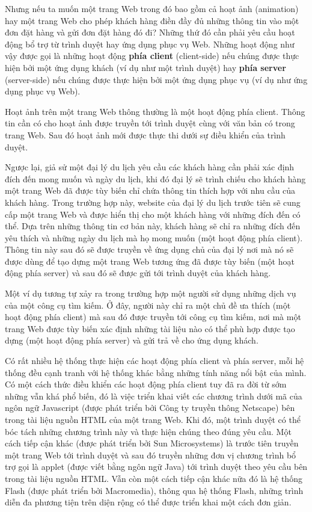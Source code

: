 Nhưng nếu ta muốn một trang Web trong đó bao gồm cả hoạt ảnh (animation) hay một
trang Web cho phép khách hàng điền đầy đủ những thông tin vào một đơn đặt hàng và gửi đơn
đặt hàng đó đi? Những thứ đó cần phải yêu cầu hoạt động bổ trợ từ trình duyệt hay ứng dụng
phục vụ Web. Những hoạt động như vậy được gọi là những hoạt động \textbf{phía client}
(client-side) nếu chúng được thực hiện bởi một ứng dụng khách (ví dụ như một trình duyệt)
hay \textbf{phía server} (server-side) nếu chúng được thực hiện bởi một ứng dụng phục vụ
(ví dụ như ứng dụng phục vụ Web).

Hoạt ảnh trên một trang Web thông thường là một hoạt động phía client. Thông tin cần có
cho hoạt ảnh được truyền tới trình duyệt cùng với văn bản có trong trang Web. Sau đó hoạt
ảnh mới được thực thi dưới sự điều khiển của trình duyệt.

Ngược lại, giả sử một đại lý du lịch yêu cầu các khách hàng cần phải xác định đích đến
mong muốn và ngày du lịch, khi đó đại lý sẽ trình chiếu cho khách hàng một trang Web đã
được tùy biến chỉ chứa thông tin thích hợp với nhu cầu của khách hàng. Trong trường hợp
này, website của đại lý du lịch trước tiên sẽ cung cấp một trang Web và được hiển thị cho
một khách hàng với những đích đến có thể. Dựa trên những thông tin cơ bản này, khách hàng
sẽ chỉ ra những đích đến yêu thích và những ngày du lịch mà họ mong muốn (một hoạt động
phía client). Thông tin này sau đó sẽ được truyền về ứng dụng chủ của đại lý nơi mà nó sẽ
được dùng để tạo dựng một trang Web tương ứng đã được tùy biến (một hoạt động phía server)
và sau đó sẽ được gửi tới trình duyệt của khách hàng.

Một ví dụ tương tự xảy ra trong trường hợp một người sử dụng những dịch vụ của một công cụ
tìm kiếm. Ở đây, người này chỉ ra một chủ đề ưa thích (một hoạt động phía client) mà sau
đó được truyền tới công cụ tìm kiếm, nơi mà một trang Web được tùy biến xác định những tài
liệu nào có thể phù hợp được tạo dựng (một hoạt động phía server) và gửi trả về cho ứng
dụng khách.

Có rất nhiều hệ thống thực hiện các hoạt động phía client và phía server, mỗi hệ thống đều
cạnh tranh với hệ thống khác bằng những tính năng nổi bật của mình. Có một cách thức điều
khiển các hoạt động phía client tuy đã ra đời từ sớm những vẫn khá phổ biến, đó là việc
triển khai viết các chương trình dưới mã của ngôn ngữ Javascript (được phát triển bởi Công
ty truyền thông Netscape) bên trong tài liệu nguồn HTML của một trang Web. Khi đó, một
trình duyệt có thể bóc tách những chương trình này và thực hiện chúng theo đúng yêu
cầu. Một cách tiếp cận khác (được phát triển bởi Sun Microsystems) là trước tiên truyền
một trang Web tới trình duyệt và sau đó truyền những đơn vị chương trình bổ trợ gọi là
applet (được viết bằng ngôn ngữ Java) tới trình duyệt theo yêu cầu bên trong tài liệu
nguồn HTML. Vẫn còn một cách tiếp cận khác nữa đó là hệ thống Flash (được phát triển bởi
Macromedia), thông qua hệ thống Flash, những trình diễn đa phương tiện trên diện rộng có
thể được triển khai một cách đơn giản.


